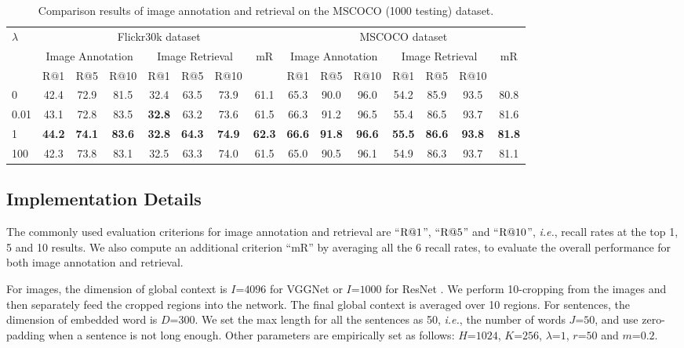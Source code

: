 \documentclass[10pt,twocolumn,letterpaper]{article}
\begin{document}
\begin{table*}[t] \small
\addtolength{\tabcolsep}{-1pt}
\centering
\caption{Comparison results of image annotation and retrieval on the MSCOCO (1000 testing) dataset. }
\begin{tabular}{l|ccc|ccc|c|ccc|ccc|c}
\hline
\hline
\multirow{3}{0.7cm}{$\lambda$}  &  \multicolumn{7}{c|}{Flickr30k dataset} &  \multicolumn{7}{c}{MSCOCO dataset}\\
\cline{2-15}
        &  \multicolumn{3}{c|}{Image Annotation}  &  \multicolumn{3}{c|}{Image Retrieval} & \multirow{2}{0.5cm}{{mR}}
&  \multicolumn{3}{c|}{Image Annotation}  &  \multicolumn{3}{c|}{Image Retrieval} & \multirow{2}{0.5cm}{{mR}}  \\
\cline{2-7}
\cline{9-14}
     & R$@$1 & R$@$5  & R$@$10   & R$@$1 & R$@$5  & R$@$10  &
&R$@$1 & R$@$5  & R$@$10   & R$@$1 & R$@$5  & R$@$10  &    \\
\hline


0       &42.4 &72.9 &81.5 &32.4 &63.5 &73.9  &61.1   &65.3 &90.0 &96.0 &54.2 &85.9 &93.5  &80.8\\
0.01    &43.1 &72.8 &83.5 &\textbf{32.8} &63.2 &73.6  &61.5   &66.3 &91.2 &96.5 &55.4 &86.5 &93.7  &81.6\\
1       &\bf{44.2} &\bf{74.1} &\bf{83.6} &\bf{32.8} &\bf{64.3} &\bf{74.9}  &\bf{62.3}   &\bf{66.6} &\bf{91.8} &\bf{96.6} &\bf{55.5} &\bf{86.6} &\bf{93.8}  &\bf{81.8}\\
100     &42.3 &73.8 &83.1 &32.5 &63.3 &74.0  &61.5   &65.0 &90.5 &96.1 &54.9 &86.3 &93.7  &81.1\\


\hline
\hline
\end{tabular}
\label{table:lambda}
\end{table*}


\subsection{Implementation Details} \label{sent:details}

The commonly used evaluation criterions for image annotation and retrieval
are ``$\rm R@1$'', ``$\rm R@5$'' and ``$\rm R@10$'',
\emph{i.e.}, recall rates at the top 1, 5 and 10 results.
We also compute an additional criterion ``mR'' by averaging
all the 6 recall rates, to evaluate the overall performance
for both image annotation and retrieval.


For images, the dimension of global context
is $I$=$4096$ for VGGNet \cite{simonyan2014very}
or $I$=$1000$ for ResNet \cite{he2016deep}.
We perform 10-cropping \cite{klein2015associating} from the images
and then separately feed the cropped regions into the network.
The final global context is averaged over 10 regions.
For sentences, the dimension of embedded word is $D$=$300$.
We set the max length for all the sentences as 50,
\emph{i.e.}, the number of words $J$=$50$,
and use zero-padding when a sentence is not long enough.
Other parameters are empirically set as follows:
$H$=$1024$, $K$=$256$, $\lambda$=$1$, $r$=$50$ and $m$=$0.2$.
\end{document}
